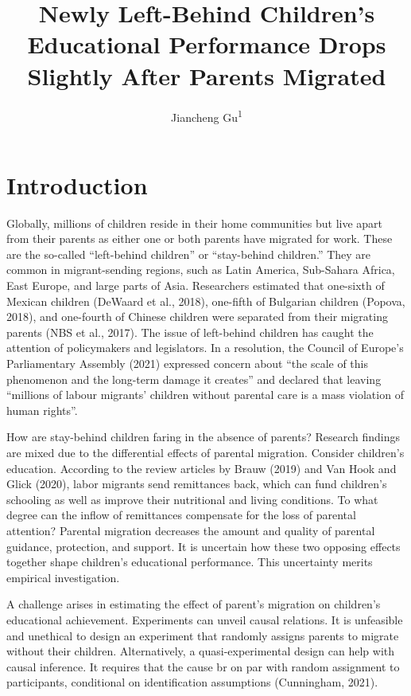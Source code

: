 \documentclass[
  man,floatsintext]{apa7}
\title{Newly Left-Behind Children's Educational Performance Drops Slightly After Parents Migrated}
\author{Jiancheng Gu\textsuperscript{1}}
\date{}
\affiliation{\vspace{0.5cm}\textsuperscript{1} Faculty of Social Sciences, Vrije Universiteit Amsterdam}
\begin{document}
\maketitle

\hypertarget{introduction}{%
\section{Introduction}\label{introduction}}

Globally, millions of children reside in their home communities but live apart from their parents as either one or both parents have migrated for work. These are the so-called ``left-behind children'' or ``stay-behind children.'' They are common in migrant-sending regions, such as Latin America, Sub-Sahara Africa, East Europe, and large parts of Asia. Researchers estimated that one-sixth of Mexican children (DeWaard et al., 2018), one-fifth of Bulgarian children (Popova, 2018), and one-fourth of Chinese children were separated from their migrating parents (NBS et al., 2017). The issue of left-behind children has caught the attention of policymakers and legislators. In a resolution, the Council of Europe's Parliamentary Assembly (2021) expressed concern about ``the scale of this phenomenon and the long-term damage it creates'' and declared that leaving ``millions of labour migrants' children without parental care is a mass violation of human rights''.

How are stay-behind children faring in the absence of parents? Research findings are mixed due to the differential effects of parental migration. Consider children's education. According to the review articles by Brauw (2019) and Van Hook and Glick (2020), labor migrants send remittances back, which can fund children's schooling as well as improve their nutritional and living conditions. To what degree can the inflow of remittances compensate for the loss of parental attention? Parental migration decreases the amount and quality of parental guidance, protection, and support. It is uncertain how these two opposing effects together shape children's educational performance. This uncertainty merits empirical investigation.

A challenge arises in estimating the effect of parent's migration on children's educational achievement. Experiments can unveil causal relations. It is unfeasible and unethical to design an experiment that randomly assigns parents to migrate without their children. Alternatively, a quasi-experimental design can help with causal inference. It requires that the cause br on par with random assignment to participants, conditional on identification assumptions (Cunningham, 2021).
\end{document}
